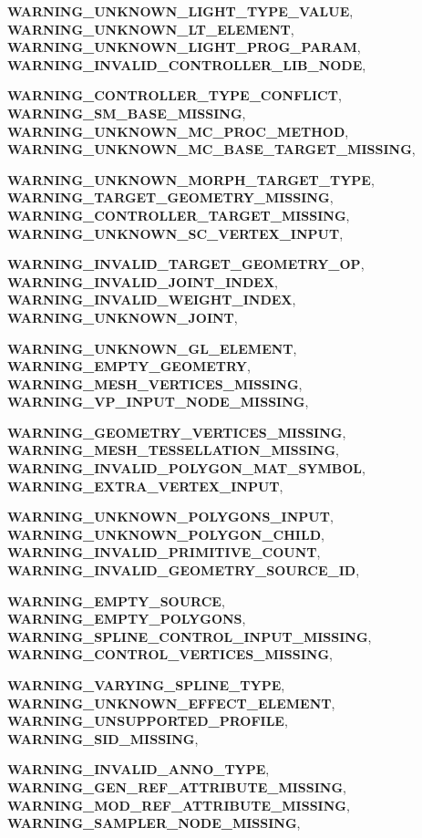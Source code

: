 \begin{DoxyCompactItemize}
\par
{\bfseries WARNING\_\-UNKNOWN\_\-LIGHT\_\-TYPE\_\-VALUE}, 
{\bfseries WARNING\_\-UNKNOWN\_\-LT\_\-ELEMENT}, 
{\bfseries WARNING\_\-UNKNOWN\_\-LIGHT\_\-PROG\_\-PARAM}, 
{\bfseries WARNING\_\-INVALID\_\-CONTROLLER\_\-LIB\_\-NODE}, 
\par
{\bfseries WARNING\_\-CONTROLLER\_\-TYPE\_\-CONFLICT}, 
{\bfseries WARNING\_\-SM\_\-BASE\_\-MISSING}, 
{\bfseries WARNING\_\-UNKNOWN\_\-MC\_\-PROC\_\-METHOD}, 
{\bfseries WARNING\_\-UNKNOWN\_\-MC\_\-BASE\_\-TARGET\_\-MISSING}, 
\par
{\bfseries WARNING\_\-UNKNOWN\_\-MORPH\_\-TARGET\_\-TYPE}, 
{\bfseries WARNING\_\-TARGET\_\-GEOMETRY\_\-MISSING}, 
{\bfseries WARNING\_\-CONTROLLER\_\-TARGET\_\-MISSING}, 
{\bfseries WARNING\_\-UNKNOWN\_\-SC\_\-VERTEX\_\-INPUT}, 
\par
{\bfseries WARNING\_\-INVALID\_\-TARGET\_\-GEOMETRY\_\-OP}, 
{\bfseries WARNING\_\-INVALID\_\-JOINT\_\-INDEX}, 
{\bfseries WARNING\_\-INVALID\_\-WEIGHT\_\-INDEX}, 
{\bfseries WARNING\_\-UNKNOWN\_\-JOINT}, 
\par
{\bfseries WARNING\_\-UNKNOWN\_\-GL\_\-ELEMENT}, 
{\bfseries WARNING\_\-EMPTY\_\-GEOMETRY}, 
{\bfseries WARNING\_\-MESH\_\-VERTICES\_\-MISSING}, 
{\bfseries WARNING\_\-VP\_\-INPUT\_\-NODE\_\-MISSING}, 
\par
{\bfseries WARNING\_\-GEOMETRY\_\-VERTICES\_\-MISSING}, 
{\bfseries WARNING\_\-MESH\_\-TESSELLATION\_\-MISSING}, 
{\bfseries WARNING\_\-INVALID\_\-POLYGON\_\-MAT\_\-SYMBOL}, 
{\bfseries WARNING\_\-EXTRA\_\-VERTEX\_\-INPUT}, 
\par
{\bfseries WARNING\_\-UNKNOWN\_\-POLYGONS\_\-INPUT}, 
{\bfseries WARNING\_\-UNKNOWN\_\-POLYGON\_\-CHILD}, 
{\bfseries WARNING\_\-INVALID\_\-PRIMITIVE\_\-COUNT}, 
{\bfseries WARNING\_\-INVALID\_\-GEOMETRY\_\-SOURCE\_\-ID}, 
\par
{\bfseries WARNING\_\-EMPTY\_\-SOURCE}, 
{\bfseries WARNING\_\-EMPTY\_\-POLYGONS}, 
{\bfseries WARNING\_\-SPLINE\_\-CONTROL\_\-INPUT\_\-MISSING}, 
{\bfseries WARNING\_\-CONTROL\_\-VERTICES\_\-MISSING}, 
\par
{\bfseries WARNING\_\-VARYING\_\-SPLINE\_\-TYPE}, 
{\bfseries WARNING\_\-UNKNOWN\_\-EFFECT\_\-ELEMENT}, 
{\bfseries WARNING\_\-UNSUPPORTED\_\-PROFILE}, 
{\bfseries WARNING\_\-SID\_\-MISSING}, 
\par
{\bfseries WARNING\_\-INVALID\_\-ANNO\_\-TYPE}, 
{\bfseries WARNING\_\-GEN\_\-REF\_\-ATTRIBUTE\_\-MISSING}, 
{\bfseries WARNING\_\-MOD\_\-REF\_\-ATTRIBUTE\_\-MISSING}, 
{\bfseries WARNING\_\-SAMPLER\_\-NODE\_\-MISSING}, 

\end{DoxyCompactItemize}
